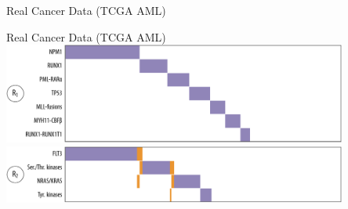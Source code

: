 \documentclass[mathserif]{beamer}
\begin{document}
\begin{frame}{Real Cancer Data (TCGA AML)}
\end{frame}

\begin{frame}{Real Cancer Data (TCGA AML)}
\vspace{1em}
\centering
\includegraphics[width=0.85\textwidth]{figures/aml_1.pdf}\\[2em]
\includegraphics[width=0.85\textwidth]{figures/aml_2.pdf}
\end{frame}
\end{document}
